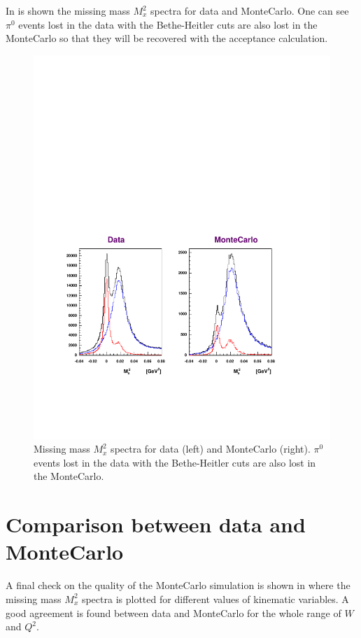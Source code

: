 \cia

In  is shown the missing mass $M_x^2$ spectra for data and MonteCarlo.
One can see $\pi^0$ events lost in the data with the Bethe-Heitler cuts are also lost in the MonteCarlo
so that they will be recovered with the acceptance calculation.     

\begin{figure}[h]
 \begin{center}
 \includegraphics[width = 15.2cm, bb=20 100 560 500]{acceptance/img/MMW} 
  \caption[Missing mass $M_x^2$ spectra for data and MonteCarlo]
          { Missing mass $M_x^2$ spectra for data (left) and MonteCarlo (right).
	             $\pi^0$ events lost in the data with the Bethe-Heitler cuts
		     are also lost in the MonteCarlo.}
 \label{fig:mmw_gsim}
 \end{center}
\end{figure}

\cia\vspace{-2cm}
\section{Comparison between data and MonteCarlo}
A final check on the quality of the MonteCarlo simulation is shown in 
 where the missing mass $M_x^2$ spectra 
is plotted for different values of kinematic variables. A good agreement is found between
data and MonteCarlo for the whole range of $W$ and $Q^2$.

